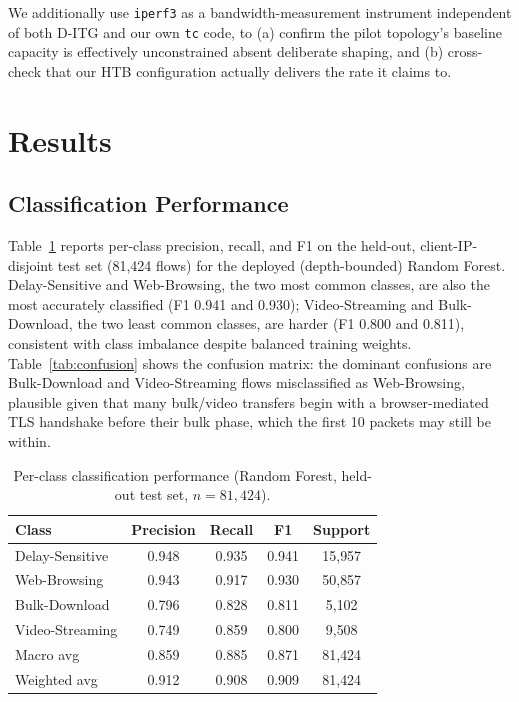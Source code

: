 \documentclass[10pt,twocolumn]{article}
\begin{document}
We additionally use \texttt{iperf3} as a bandwidth-measurement instrument
independent of both D-ITG and our own \texttt{tc} code, to (a) confirm the
pilot topology's baseline capacity is effectively unconstrained absent
deliberate shaping, and (b) cross-check that our HTB configuration
actually delivers the rate it claims to.

\section{Results}
\label{sec:results}

\subsection{Classification Performance}

Table~\ref{tab:classification} reports per-class precision, recall, and
F1 on the held-out, client-IP-disjoint test set (81{,}424 flows) for the
deployed (depth-bounded) Random Forest. Delay-Sensitive and Web-Browsing,
the two most common classes, are also the most accurately classified
(F1 0.941 and 0.930); Video-Streaming and Bulk-Download, the two least
common classes, are harder (F1 0.800 and 0.811), consistent with class
imbalance despite balanced training weights. Table~\ref{tab:confusion}
shows the confusion matrix: the dominant confusions are Bulk-Download and
Video-Streaming flows misclassified as Web-Browsing, plausible given that
many bulk/video transfers begin with a browser-mediated TLS handshake
before their bulk phase, which the first 10 packets may still be within.

\begin{table}[t]
\centering
\caption{Per-class classification performance (Random Forest, held-out test set, \(n=81{,}424\)).}
\label{tab:classification}
\begin{tabular}{lcccc}
\toprule
Class & Precision & Recall & F1 & Support \\
\midrule
Delay-Sensitive & 0.948 & 0.935 & 0.941 & 15{,}957 \\
Web-Browsing & 0.943 & 0.917 & 0.930 & 50{,}857 \\
Bulk-Download & 0.796 & 0.828 & 0.811 & 5{,}102 \\
Video-Streaming & 0.749 & 0.859 & 0.800 & 9{,}508 \\
\midrule
Macro avg & 0.859 & 0.885 & 0.871 & 81{,}424 \\
Weighted avg & 0.912 & 0.908 & 0.909 & 81{,}424 \\
\bottomrule
\end{tabular}
\end{table}
\end{document}
